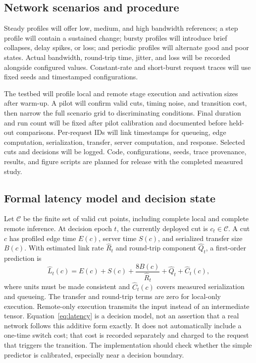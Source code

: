 \documentclass[10pt,a4paper,twocolumn]{article}
\begin{document}
\subsection{Network scenarios and procedure}
Steady profiles will offer low, medium, and high bandwidth references; a step profile will contain a sustained change; bursty profiles will introduce brief collapses, delay spikes, or loss; and periodic profiles will alternate good and poor states. Actual bandwidth, round-trip time, jitter, and loss will be recorded alongside configured values. Constant-rate and short-burst request traces will use fixed seeds and timestamped configurations.

The testbed will profile local and remote stage execution and activation sizes after warm-up. A pilot will confirm valid cuts, timing noise, and transition cost, then narrow the full scenario grid to discriminating conditions. Final duration and run count will be fixed after pilot calibration and documented before held-out comparisons. Per-request IDs will link timestamps for queueing, edge computation, serialization, transfer, server computation, and response. Selected cuts and decisions will be logged. Code, configurations, seeds, trace provenance, results, and figure scripts are planned for release with the completed measured study.

\subsection{Formal latency model and decision state}
Let $\mathcal C$ be the finite set of valid cut points, including complete local and complete remote inference. At decision epoch $t$, the currently deployed cut is $c_t\in\mathcal C$. A cut $c$ has profiled edge time $E(c)$, server time $S(c)$, and serialized transfer size $B(c)$. With estimated link rate $\widehat R_t$ and round-trip component $\widehat Q_t$, a first-order prediction is
\begin{equation}
\widehat L_t(c)=E(c)+S(c)+\frac{8B(c)}{\widehat R_t}+\widehat Q_t+\widehat C_t(c),
\label{eq:latency}
\end{equation}
where units must be made consistent and $\widehat C_t(c)$ covers measured serialization and queueing. The transfer and round-trip terms are zero for local-only execution. Remote-only execution transmits the input instead of an intermediate tensor. Equation~\ref{eq:latency} is a decision model, not an assertion that a real network follows this additive form exactly. It does not automatically include a one-time switch cost; that cost is recorded separately and charged to the request that triggers the transition. The implementation should check whether the simple predictor is calibrated, especially near a decision boundary.
\end{document}
